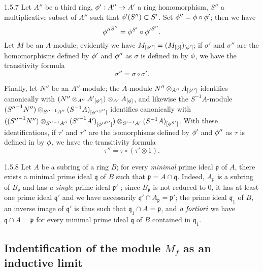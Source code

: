 \begin{env}{1.5.7}
\label{env-0.1.5.7}
Let $A''$ be a third ring, $\phi':A''\to A'$ a ring homomorphism, $S''$ a multiplicative
subset of $A''$ such that $\phi'(S'')\subset S'$. Set $\phi''=\phi\circ\phi'$; then we
have
\[
  {\phi''}^{S''}=\phi^{S'}\circ{\phi'}^{S''}.
\]
Let $M$ be an $A$-module; evidently we have $M_{[\phi'']}=(M_{[\phi]})_{[\phi']}$;
if $\sigma'$ and $\sigma''$ are the homomorphisms defined by $\phi'$ and $\phi''$ as
$\sigma$ is defined in  by $\phi$, we have the transitivity formula
\[
  \sigma''=\sigma\circ\sigma'.
\]

Finally, let $N''$ be an $A''$-module; the $A$-module $N''\otimes_{A''}A_{[\phi'']}$
identifies canonically with $(N''\otimes_{A''}{A'}_{[\phi']})\otimes_{A'}A_{[\phi]}$,
and likewise the $S^{-1}A$-module
${({S''}^{-1}N'')\otimes_{{S''}^{-1}A''}(S^{-1}A)_{[{\phi''}^{S''}]}}$ identifies
canonically with
$(({S''}^{-1}N'')\otimes_{{S''}^{-1}A''}({S'}^{-1}A')_{[{\phi'}^{S''}]})
  \otimes_{{S'}^{-1}A'}(S^{-1}A)_{[\phi^{S'}]}$. With these identifications, if $\tau'$
and $\tau''$ are the isomorphisms defined by $\phi'$ and $\phi''$ as $\tau$ is defined
in  by $\phi$, we have the transitivity formula
\[
  \tau''=\tau\circ(\tau'\otimes 1).
\]
\end{env}

\begin{env}{1.5.8}
\label{env-0.1.5.8}
Let $A$ be a subring of a ring $B$; for every \emph{minimal} prime ideal $\mathfrak{p}$ of
$A$, there exists a minimal prime ideal $\mathfrak{q}$ of $B$ such that
$\mathfrak{p}=A\cap\mathfrak{q}$. Indeed, $A_\mathfrak{p}$ is a subring of $B_\mathfrak{p}$
 and has \emph{a single} prime ideal $\mathfrak{p}'$ ;
since $B_\mathfrak{p}$ is not reduced to $0$, it has at least one prime ideal $\mathfrak{q}'$
and we have necessarily $\mathfrak{q}'\cap A_\mathfrak{p}=\mathfrak{p}'$; the prime ideal
$\mathfrak{q}_1$ of $B$, an inverse image of $\mathfrak{q}'$ is thus such that
$\mathfrak{q}_1\cap A=\mathfrak{p}$, and $\emph{a fortiori}$ we have
$\mathfrak{q}\cap A=\mathfrak{p}$ for every minimal prime ideal $\mathfrak{q}$ of $B$
contained in $\mathfrak{q}_1$.
\end{env}

\subsection{Indentification of the module $M_f$ as an inductive limit}
\label{0-prelim-1.6}

